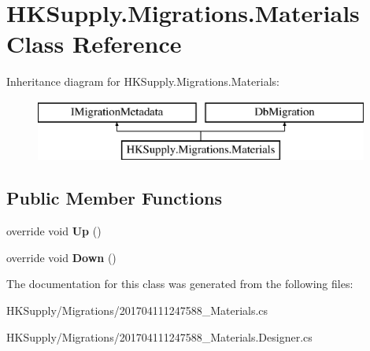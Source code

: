 \hypertarget{class_h_k_supply_1_1_migrations_1_1_materials}{}\section{H\+K\+Supply.\+Migrations.\+Materials Class Reference}
\label{class_h_k_supply_1_1_migrations_1_1_materials}
Inheritance diagram for H\+K\+Supply.\+Migrations.\+Materials\+:\begin{figure}[H]
\begin{center}
\leavevmode
\includegraphics[height=2.000000cm]{class_h_k_supply_1_1_migrations_1_1_materials}
\end{center}
\end{figure}
\subsection*{Public Member Functions}
\begin{DoxyCompactItemize}
\item 
\mbox{\label{class_h_k_supply_1_1_migrations_1_1_materials_adfc9523d6b61e09991f9c97065b6e7f7}} 
override void {\bfseries Up} ()
\item 
\mbox{\label{class_h_k_supply_1_1_migrations_1_1_materials_a3102b72b8442d353a7389fa6fc9b4bba}} 
override void {\bfseries Down} ()
\end{DoxyCompactItemize}


The documentation for this class was generated from the following files\+:\begin{DoxyCompactItemize}
\item 
H\+K\+Supply/\+Migrations/201704111247588\+\_\+\+Materials.\+cs\item 
H\+K\+Supply/\+Migrations/201704111247588\+\_\+\+Materials.\+Designer.\+cs\end{DoxyCompactItemize}
